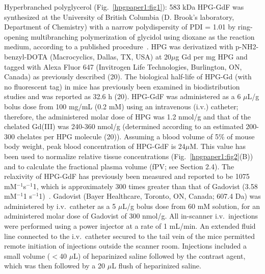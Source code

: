 Hyperbranched polyglycerol (Fig.~\ref{hpgpaper1:fig1}): 583 \acs{kDa} \acs{HPG-GdF} was synthesized at the University of British Columbia (D. Brook's laboratory, Department of Chemistry) with a narrow polydispersity of PDI = 1.01 by ring-opening multibranching polymerization of glycidol using dioxane as the reaction medium, according to a published procedure~\cite{Kainthan:2006ce}.
HPG was derivatized with p-NH2-benzyl-DOTA (Macrocyclics, Dallas, TX, USA) at 20$\mu$g Gd per mg HPG and tagged with Alexa Fluor 647 (Invitrogen Life Technologies, Burlington, ON, Canada) as previously described (20).
The biological half-life of HPG-Gd (with no fluorescent tag) in mice has previously been examined in biodistribution studies and was reported as 32.6 h (20).
HPG-GdF was administered as a 6 $\mu$L/g bolus dose from 100 mg/mL (0.2 mM) using an intravenous (i.v.) catheter; therefore, the administered molar dose of HPG was 1.2 nmol/g and that of the chelated Gd(III) was 240-360 nmol/g (determined according to an estimated 200-300 chelates per HPG molecule (20)).
Assuming a blood volume of 5\% of mouse body weight, peak blood concentration of \acs{HPG-GdF} is 24$\mu$M.
This value has been used to normalize relative tissue concentrations (Fig.~\ref{hpgpaper1:fig2}(B)) and to calculate the fractional plasma volume (fPV; see Section 2.4).
The relaxivity of \acs{HPG-GdF} has previously been measured and reported to be 1075 mM$^{-1}$s$^{-1}$1, which is approximately 300 times greater than that of Gadovist (3.58 mM$^{-1}$1 s$^{-1}$1)~\cite{Saatchi:2012hc}.
Gadovist (Bayer Healthcare, Toronto, ON, Canada; 607.4 \acs{Da}) was administered by i.v.\ catheter as a 5 $\mu$L/g bolus dose from 60 mM solution, for an administered molar dose of Gadovist of 300 nmol/g.
All in-scanner i.v.\ injections were performed using a power injector at a rate of 1 mL/min.
An extended fluid line connected to the i.v.\ catheter secured to the tail vein of the mice permitted remote initiation of injections outside the scanner room.
Injections included a small volume ($<$40 $\mu$L) of heparinized saline followed by the contrast agent, which was then followed by a 20 $\mu$L flush of heparinized saline.

